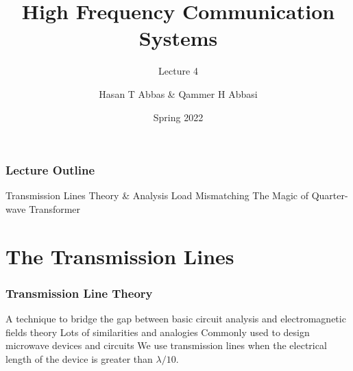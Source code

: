 \documentclass[10pt, compress]{beamer}
\title{High Frequency Communication Systems}
\subtitle{Lecture 4}
\date{Spring 2022}
\author{Hasan T Abbas \& Qammer H Abbasi}
\begin{document}
\maketitle

\begin{frame}[fragile]
  \frametitle{Lecture Outline}
\begin{outline}[itemize]
  \1 Transmission Lines Theory \& Analysis
  \1 Load Mismatching
  \1 The Magic of Quarter-wave Transformer
\end{outline}
\end{frame}
\section{The Transmission Lines}

\begin{frame}[fragile]
\frametitle{Transmission Line Theory}
\begin{outline}
  \1 A technique to bridge the gap between basic circuit analysis and electromagnetic fields theory
   \2 Lots of similarities and analogies
    \1 Commonly used to design microwave devices and circuits
    \1 We use transmission lines when the electrical length of the device is greater than $\lambda / 10$.
\end{outline}
\end{frame}
\end{document}
